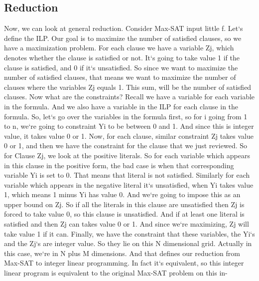 \subsection{Reduction}
Now, we can look at general reduction.
Consider Max-SAT input little f.
Let`s define the ILP\@.
Our goal is to maximize the number of satisfied clauses, so we have a maximization problem.
For each clause we have a variable Zj, which denotes whether the clause is satisfied or not.
It`s going to take value 1 if the clause is satisfied, and 0 if it`s unsatisfied.
So since we want to maximize the number of satisfied clauses, that means we want to maximize the number of clauses where the variables Zj equals 1.
This sum, will be the number of satisfied clauses.
Now what are the constraints? Recall we have a variable for each variable in the formula.
And we also have a variable in the ILP for each clause in the formula.
So, let`s go over the variables in the formula first, so for i going from 1 to n, we`re going to constraint Yi to be between 0 and 1.
And since this is integer value, it takes value 0 or 1.
Now, for each clause, similar constraint Zj takes value 0 or 1, and then we have the constraint for the clause that we just reviewed.
So for Clause Zj, we look at the positive literals.
So for each variable which appears in this clause in the positive form, the bad case is when that corresponding variable Yi is set to 0.
That means that literal is not satisfied.
Similarly for each variable which appears in the negative literal it`s unsatisfied, when Yi takes value 1, which means 1 minus Yi has value 0.
And we`re going to impose this as an upper bound on Zj.
So if all the literals in this clause are unsatisfied then Zj is forced to take value 0, so this clause is unsatisfied.
And if at least one literal is satisfied and then Zj can takes value 0 or 1.
And since we`re maximizing, Zj will take value 1 if it can.
Finally, we have the constraint that these variables, the Yi`s and the Zj`s are integer value.
So they lie on this N dimensional grid.
Actually in this case, we`re in N plus M dimensions.
And that defines our reduction from Max-SAT to integer linear programming.
In fact it`s equivalent, so this integer linear program is equivalent to the original Max-SAT problem on this in-

